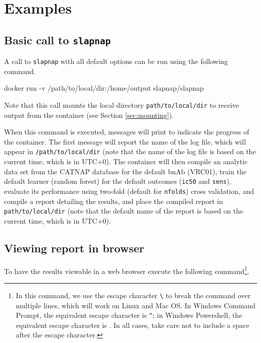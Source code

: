 \documentclass[
]{article}
\newenvironment{Shaded}{\begin{snugshade}}{\end{snugshade}}
\newcommand{\ExtensionTok}[1]{#1}
\newcommand{\NormalTok}[1]{#1}
\begin{document}
\hypertarget{sec:examples}{%
\section{Examples}\label{sec:examples}}

\hypertarget{basic-call-to-slapnap}{%
\subsection{\texorpdfstring{Basic call to \texttt{slapnap}}{Basic call to slapnap}}\label{basic-call-to-slapnap}}

A call to \texttt{slapnap} with all default options can be run using the following command.

\begin{Shaded}
\begin{Highlighting}[]
\ExtensionTok{docker}\NormalTok{ run {-}v /path/to/local/dir:/home/output slapnap/slapnap}
\end{Highlighting}
\end{Shaded}

Note that this call mounts the local directory \texttt{path/to/local/dir} to receive output from the container (see Section \ref{sec:mounting}).

When this command is executed, messages will print to indicate the progress of the container. The first message will report the name of the log file, which will appear in \texttt{/path/to/local/dir} (note that the name of the log file is based on the current time, which is in UTC+0). The container will then compile an analytic data set from the CATNAP database for the default bnAb (VRC01), train the default learner (random forest) for the default outcomes (\texttt{ic50} and \texttt{sens}), evaluate its performance using two-fold (default for \texttt{nfolds}) cross validation, and compile a report detailing the results, and place the compiled report in \texttt{path/to/local/dir} (note that the default name of the report is based on the current time, which is in UTC+0).

\hypertarget{sec:webbrowse}{%
\subsection{Viewing report in browser}\label{sec:webbrowse}}

To have the results viewable in a web browser execute the following command\footnote{In this command, we use the escape character \texttt{\textbackslash{}} to break the command over multiple lines, which will work on Linux and Mac OS. In Windows Command Prompt, the equivalent escape character is \texttt{\^{}}; in Windows Powershell, the equivalent escape character is \texttt{\textasciigrave{}}. In all cases, take care not to include a space after the escape character.}.
\end{document}
